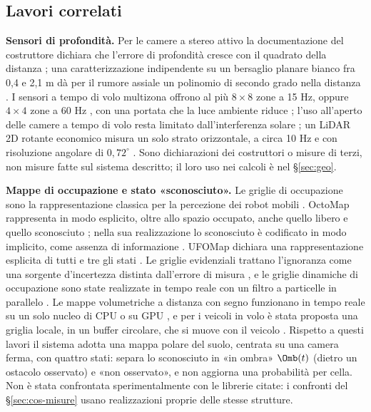 \subsection{Lavori correlati}\label{sec:cos-correlati}

\textbf{Sensori di profondità.} Per le camere a stereo attivo la documentazione del costruttore dichiara che l'errore di profondità cresce con il quadrato della distanza \cite{realsense-taratura-profondita}; una caratterizzazione indipendente su un bersaglio planare bianco fra 0,4 e 2,1 m dà per il rumore assiale un polinomio di secondo grado nella distanza \cite{ahn2019}. I sensori a tempo di volo multizona offrono al più $8\times8$ zone a 15 Hz, oppure $4\times4$ zone a 60 Hz \cite{st-um2884}, con una portata che la luce ambiente riduce \cite{st-vl53l7cx}; l'uso all'aperto delle camere a tempo di volo resta limitato dall'interferenza solare \cite{qiu2023}; un LiDAR 2D rotante economico misura un solo strato orizzontale, a circa 10 Hz e con risoluzione angolare di $0{,}72^\circ$ \cite{slamtec-rplidar-c1}. Sono dichiarazioni dei costruttori o misure di terzi, non misure fatte sul sistema descritto; il loro uso nei calcoli è nel \S\ref{sec:geo}.

\textbf{Mappe di occupazione e stato «sconosciuto».} Le griglie di occupazione sono la rappresentazione classica per la percezione dei robot mobili \cite{elfes1989}. OctoMap rappresenta in modo esplicito, oltre allo spazio occupato, anche quello libero e quello sconosciuto \cite{hornung2013}; nella sua realizzazione lo sconosciuto è codificato in modo implicito, come assenza di informazione \cite{octomap}. UFOMap dichiara una rappresentazione esplicita di tutti e tre gli stati \cite{duberg2020}. Le griglie evidenziali trattano l'ignoranza come una sorgente d'incertezza distinta dall'errore di misura \cite{moras2011}, e le griglie dinamiche di occupazione sono state realizzate in tempo reale con un filtro a particelle in parallelo \cite{nuss2018}. Le mappe volumetriche a distanza con segno funzionano in tempo reale su un solo nucleo di CPU \cite{oleynikova2017} o su GPU \cite{millane2024,niessner2013}, e per i veicoli in volo è stata proposta una griglia locale, in un buffer circolare, che si muove con il veicolo \cite{usenko2017}. Rispetto a questi lavori il sistema adotta una mappa polare del suolo, centrata su una camera ferma, con quattro stati: separa lo sconosciuto in «in ombra» $\Omb(t)$ (dietro un ostacolo osservato) e «non osservato», e non aggiorna una probabilità per cella. Non è stata confrontata sperimentalmente con le librerie citate: i confronti del \S\ref{sec:cos-misure} usano realizzazioni proprie delle stesse strutture.

